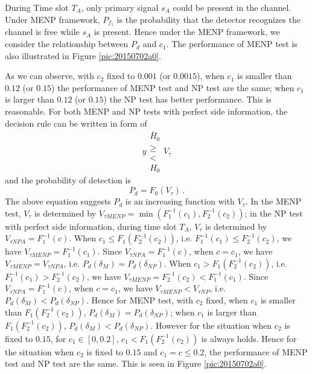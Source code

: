During Time slot $T_A$, only primary signal $s_A$ could be present in the channel. Under MENP framework, $P_{f_1}$ is the probability that the detector recognizes the channel is free while $s_A$ is present. 
Hence under the MENP framework, we consider the relationship between $P_d$ and $c_1$. The performance of MENP test is also illustrated in Figure \ref{pic:20150702a0}.  

As we can observe, with $c_2$  fixed to $0.001$ (or $0.0015$), when $c_1$ is smaller than $0.12$ (or $0.15$) the performance of MENP test and NP test are the same; when $c_1$ is larger than $0.12$ (or $0.15$) the NP test has better performance. This is reasonable.  
For both MENP and NP tests with perfect side information, the decision rule can be written in form of
\begin{equation}
  y  \substack{\bar{H}_0 \\ \geq \\ < \\ H_0} V_\tau
\end{equation}
and the probability of detection is 
\begin{equation}
  P_d = F_0(V_\tau)\,.
\end{equation}
The above equation suggests $P_d$ is an increasing function with $V_\tau$. 
In the MENP test, $V_\tau$ is determined by $V_{\tau MENP}= \min (F_1^{-1}(c_1), F_2^{-1}(c_2))$; in the NP test with perfect side information, during time slot $T_A$, $V_\tau$ is determined by $V_{\tau NP A} = F_1^{-1}(c)$. When $c_1 \leq F_1(F_2^{-1}(c_2))$, i.e. $F_1^{-1}(c_1) \leq  F_2^{-1}(c_2)$, we have  $V_{\tau MENP} = F_1^{-1}(c_1)$. Since $V_{\tau NP A} = F_1^{-1}(c)$, when $c = c_1$, we have $V_{\tau MENP} = V_{\tau NPA}$, i.e.  $P_d(\delta_M) = P_d(\delta_{NP})$.    
When $c_1 > F_1(F_2^{-1}(c_2))$, i.e. $F_1^{-1}(c_1) > F_2^{-1}(c_2)$, we have  $V_{\tau MENP} = F_2^{-1}(c_2) < F_1^{-1}(c_1)$. Since $V_{\tau NP A} = F_1^{-1}(c)$, when $c = c_1$, we have 
$V_{\tau MENP} < V_{\tau NP}$, i.e.  $P_d(\delta_M) < P_d(\delta_{NP})$.
Hence for MENP test, with $c_2$ fixed, when $c_1$ is smaller than $F_1( F_2^{-1}(c_2) ) $, $P_d(\delta_M) = P_d(\delta_{NP})$; when $c_1$ is larger than $ F_1( F_2^{-1}(c_2))$, $P_d(\delta_M) < P_d(\delta_{NP})$. 
However for the situation when  $c_2$ is fixed to $0.15$, for $c_1 \in [0, 0.2]$, $c_1 <  F_1(F_2^{-1}(c_2))$ is always holds. Hence for the situation when $c_2$ is fixed to $0.15$ and $c_1 = c \leq 0.2$, the performance of MENP test and NP test are the same. This is seen in Figure \ref{pic:20150702a0}. 

